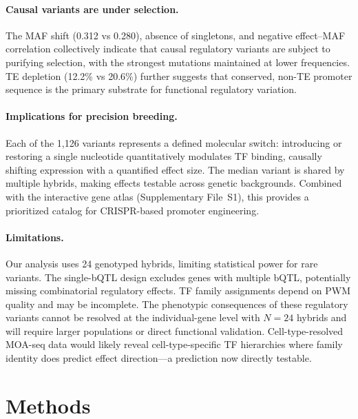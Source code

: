 \documentclass[11pt,a4paper]{article}
\begin{document}
\paragraph{Causal variants are under selection.}
The MAF shift (0.312 vs 0.280), absence of singletons, and negative
effect--MAF correlation collectively indicate that causal regulatory
variants are subject to purifying selection, with the strongest mutations
maintained at lower frequencies. TE depletion (12.2\% vs 20.6\%) further
suggests that conserved, non-TE promoter sequence is the primary substrate
for functional regulatory variation.

\paragraph{Implications for precision breeding.}
Each of the 1,126 variants represents a defined molecular switch:
introducing or restoring a single nucleotide quantitatively modulates TF
binding, causally shifting expression with a quantified effect size. The
median variant is shared by multiple hybrids, making effects testable across
genetic backgrounds. Combined with the interactive gene atlas
(Supplementary File~S1), this provides a prioritized catalog for
CRISPR-based promoter engineering.

\paragraph{Limitations.}
Our analysis uses 24 genotyped hybrids, limiting statistical power for rare
variants. The single-bQTL design excludes genes with multiple bQTL,
potentially missing combinatorial regulatory effects. TF family assignments
depend on PWM quality and may be incomplete. The phenotypic consequences of
these regulatory variants cannot be resolved at the individual-gene level
with $N = 24$ hybrids and will require larger populations or direct
functional validation. Cell-type-resolved MOA-seq data would likely reveal
cell-type-specific TF hierarchies where family identity does predict effect
direction---a prediction now directly testable.


\section{Methods}
\end{document}
